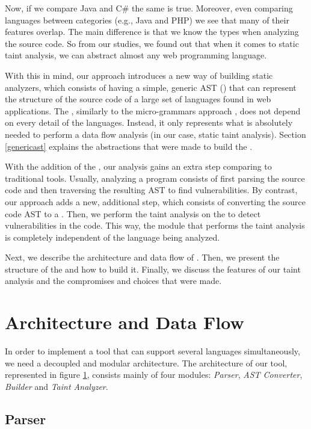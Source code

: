 Now, if we compare Java and C\# the same is true. Moreover, even comparing languages between categories (e.g., Java and PHP) we see that many of their features overlap. The main difference is that we know the types when analyzing the source code. So from our studies, we found out that when it comes to static taint analysis, we can abstract almost any web programming language. 

With this in mind, our approach introduces a new way of building static analyzers, which consists of having a simple, generic AST (\astname{}) that can represent the structure of the source code of a large set of languages found in web applications. The \astname{}, similarly to the micro-grammars approach \cite{microgrammars}, does not depend on every detail of the languages. Instead, it only represents what is absolutely needed to perform a data flow analysis (in our case, static taint analysis). Section \ref{genericast} explains the abstractions that were made to build the \astname{}.

With the addition of the \astname{}, our analysis gains an extra step comparing to traditional tools. Usually, analyzing a program consists of first parsing the source code and then traversing the resulting AST to find vulnerabilities. By contrast, our approach adds a new, additional step, which consists of converting the source code AST to a \astname{}. Then, we perform the taint analysis on the \astname{} to detect vulnerabilities in the code. This way, the module that performs the taint analysis is completely independent of the language being analyzed. 

Next, we describe the architecture and data flow of \toolname{}. Then, we present the  structure of the \astname{} and how to build it. Finally, we discuss the features of our taint analysis and the compromises and choices that were made.


\section{Architecture and Data Flow}
\label{architecture}


In order to implement a tool that can support several languages simultaneously, we need a decoupled and modular architecture. The architecture of our tool, represented in figure \ref{architecture}, consists mainly of four modules: \textit{Parser}, \textit{AST Converter}, \textit{\astname{} Builder} and \textit{Taint Analyzer}.

\subsection{Parser} 

